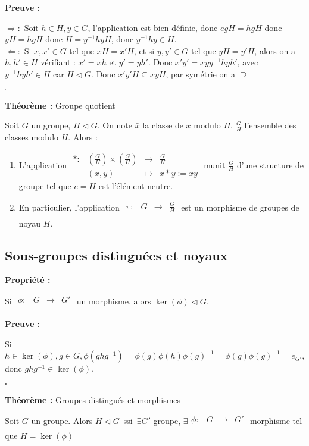 \documentclass{report}
\renewenvironment{leftbar}{%
  \def\FrameCommand{\vrule width 0.4pt \hspace{10pt}}%
  \MakeFramed {\advance\hsize-\width \FrameRestore}}%
 {\endMakeFramed}%
\newenvironment{preuve}{\vspace*{0.5cm}
    \begin{leftbar}
    \noindent\textbf{Preuve :}\par}{
    \begin{flushright}
    $\square$
    \end{flushright}
    \end{leftbar}
}
\newenvironment{prop}{\begin{tcolorbox}[colframe= white]
    \textbf{Propriété :}
     \par}
    {\end{tcolorbox}}
\newenvironment{theoreme}[1][]{
    \begin{tcolorbox}[]
    \textbf{Théorème :} #1  \par} 
    {\end{tcolorbox}}
\newcommand{\fonction}[5]{
    \begin{array}{l|rcl}
    #1: & #2 & \longrightarrow & #3 \\
        & #4 & \longmapsto & #5 
    \end{array}
}
\newcommand{\fctsarg}[3]{
    \begin{array}{lrcl}
    #1: & #2 & \longrightarrow & #3 \\
    \end{array}
}
\begin{document}
\begin{preuve}
$\Rightarrow :$ Soit $h \in H,y \in G$, l'application est bien définie, donc $egH = hgH$ donc $yH = hgH$ donc $H = y^{-1}hyH$, donc $y^{-1}hy \in H$.\\
$\Leftarrow : $ Si $x,x' \in G$ tel que $xH = x'H$, et si $y,y' \in G$ tel que $yH = y'H$, alors on a $h,h' \in H$ vérifiant : $x' = xh$ et $y' = yh'$. Donc $x'y' = xy y^{-1}hyh'$, avec $y^{-1}hyh' \in H$ car $H \triangleleft G$. Donc $x'y'H \subseteq xyH$, par symétrie on a $\supseteq$
\end{preuve}

\begin{theoreme}[Groupe quotient]
    Soit $G$ un groupe, $H \triangleleft G$. On note $\bar{x}$ la classe de $x$ modulo $H$, $\displaystyle\frac{G}{H}$ l'ensemble des classes modulo $H$. Alors : \par
    \begin{enumerate}
        \item L'application $\fonction{\ast}{(\displaystyle\frac{G}{H})\times (\displaystyle\frac{G}{H})}{\displaystyle\frac{G}{H}}{(\bar{x},\bar{y})}{\bar{x} \ast \bar{y} := \bar{xy}}$ munit $\displaystyle\frac{G}{H}$ d'une structure de groupe tel que $\bar{e} = H$ est l'élément neutre.
        \item En particulier, l'application $\fctsarg{\pi}{G}{\displaystyle\frac{G}{H}}$ est un morphisme de groupes de noyau $H$.
    \end{enumerate}
\end{theoreme}

\subsection{Sous-groupes distinguées et noyaux}

\begin{prop}
    Si $\fctsarg{\phi}{G}{G'}$ un morphisme, alors $\ker(\phi) \triangleleft G$.
\end{prop}

\begin{preuve}
    Si $h \in \ker(\phi), g \in G, \phi(ghg^{-1}) = \phi(g)\phi(h)\phi(g)^{-1} = \phi(g)\phi(g)^{-1} = e_{G'}$, donc $ghg^{-1} \in \ker(\phi)$.
\end{preuve}

\begin{theoreme}[Groupes distingués et morphismes]
    Soit $G$ un groupe. Alors $H \triangleleft G \,$ ssi $\, \exists G'$ groupe, $\exists \fctsarg{\phi}{G}{G'}$ morphisme tel que $H = \ker(\phi)$
\end{theoreme}
\end{document}
